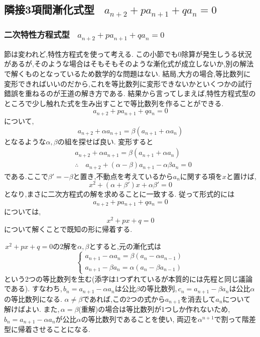 \documentclass[dvipdfmx,a4paper,11pt,fleqn,openany]{jsbook}
\begin{document}
  \subsection{隣接3項間漸化式型 \, $\displaystyle a_{n+2}+pa_{n+1}+qa_n=0$}
    \subsubsection{二次特性方程式型 \, $\displaystyle a_{n+2}+pa_{n+1}+qa_n=0$}
      節は変われど,特性方程式を使って考える.
      この小節でも0除算が発生しうる状況があるが,そのような場合はそもそもそのような漸化式が成立しないか,別の解法で解くものとなっているため数学的な問題はない.
      結局,大方の場合,等比数列に変形できればいいのだから,これを等比数列に変形できないかといくつかの試行錯誤を重ねるのが王道の解き方である.
      結果から言ってしまえば,特性方程式型のところで少し触れた式を生み出すことで等比数列を作ることができる.
      \[
        a_{n+2}+pa_{n+1}+qa_n=0
      \]
      について,
      \[
        a_{n+2}+\alpha a_{n+1}=\beta(a_{n+1}+\alpha a_{n})
      \]
      となるような$\alpha,\beta$の組を探せば良い.
      変形すると
      \begin{align*}
        &a_{n+2}+\alpha a_{n+1}=\beta(a_{n+1}+\alpha a_{n})\\
        &\therefore \quad a_{n+2}+(\alpha-\beta)a_{n+1}-\alpha\beta a_n=0
      \end{align*}
      である.ここで$\beta'=-\beta$と置き,不動点を考えているから$a_n$に関する項を$x$と置けば,
      \[
        x^2+(\alpha+\beta')x+\alpha\beta'=0      
      \]
      となり,まさに二次方程式の解を求めることに一致する.
      従って形式的には
      \[
        a_{n+2}+pa_{n+1}+qa_n=0
      \]
      については,
      \[
        x^2+px+q=0
      \]
      について解くことで既知の形に帰着する.

      \,$x^2+px+q=0$の2解を$\alpha,\beta$とすると,元の漸化式は
      \[
        \begin{cases}
          a_{n+1}-\alpha a_n=\beta(a_n-\alpha a_{n-1})\\
          a_{n+1}-\beta a_n=\alpha(a_n-\beta a_{n-1})
        \end{cases}
      \]
      という2つの等比数列を生む(添字は1つずれているが本質的には先程と同じ議論である).
      すなわち,\,$b_n=a_{n+1}-\alpha a_n$は公比$\beta$の等比数列,\,$c_n=a_{n+1}-\beta a_n$は公比$\alpha$の等比数列になる.
      $\alpha\ne\beta$であれば,この2つの式から$a_{n+1}$を消去して$a_n$について解けばよい.
      また,\,$\alpha=\beta$(重解)の場合は等比数列が1つしか作れないため,\,$b_n=a_{n+1}-\alpha a_n$が公比$\alpha$の等比数列であることを使い,
      両辺を$\alpha^{n+1}$で割って階差型に帰着させることになる.
\end{document}
